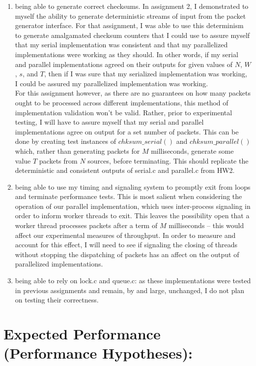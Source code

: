 \documentclass[]{article}
\begin{document}
\begin{enumerate}
	\item being able to generate correct checksums. In assignment 2, I demonstrated to myself the ability to generate deterministic streams of input from the packet generator interface. For that assignment, I was able to use this determinism to generate amalgamated checksum counters that I could use to assure myself that my serial implementation was consistent and that my parallelized implementations were working as they should. In other words, if my serial and parallel implementations agreed on their outputs for given values of $N$, $W$, $s$, and $T$, then if I was sure that my serialized implementation was working, I could be assured my parallelized implementation was working.
	\\
	For this assignment however, as there are no guarantees on how many packets ought to be processed across different implementations, this method of implementation validation won't be valid. Rather, prior to experimental testing, I will have to assure myself that my serial and parallel implementations agree on output for a set number of packets. This can be done by creating test instances of $chksum\_serial()$ and $chksum\_parallel()$ which, rather than generating packets for $M$ milliseconds, generate some value $T$ packets from $N$ sources, before terminating. This should replicate the deterministic and consistent outputs of serial.c and parallel.c from HW2.
	\item being able to use my timing and signaling system to promptly exit from loops and terminate performance tests. This is most salient when considering the operation of our parallel implementation, which uses inter-process signaling in order to inform worker threads to exit. This leaves the possibility open that a worker thread processes packets after a term of $M$ milliseconds -- this would affect our experimental measures of throughput. In order to measure and account for this effect, I will need to see if signaling the closing of threads without stopping the dispatching of packets has an affect on the output of parallelized implementations.
	\item being able to rely on lock.c and queue.c: as these implementations were tested in previous assignments and remain, by and large, unchanged, I do not plan on testing their correctness.
\end{enumerate}

\section{Expected Performance (Performance Hypotheses):}
	
\end{document}
